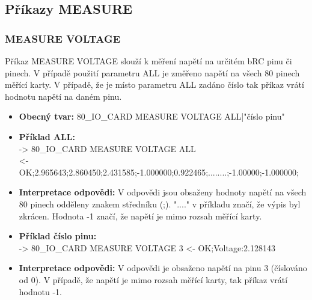 \subsection{Příkazy MEASURE} \label{measure commands}
\subsubsection{MEASURE VOLTAGE}
Příkaz MEASURE VOLTAGE slouží k měření napětí na určitém bRC pinu či pinech.
V případě použití parametru ALL je změřeno napětí na všech 80 pinech měřící karty.
V případě, že je místo parametru ALL zadáno číslo tak příkaz vrátí hodnotu napětí na daném pinu.\\

\begin{itemize}[leftmargin=*]
    \item \textbf{Obecný tvar:} 80\_IO\_CARD MEASURE VOLTAGE ALL|"číslo pinu"
    \item \textbf{Příklad ALL:}\\
    -> 80\_IO\_CARD MEASURE VOLTAGE ALL\\
    <- OK;2.965643;2.860450;2.431585;-1.000000;0.922465;........;-1.00000;-1.000000;
    \item \textbf{Interpretace odpovědi:} V odpovědi jsou obsaženy
    hodnoty napětí na všech 80 pinech odděleny znakem středníku (;). "...." v příkladu značí, že výpis byl zkrácen.
    Hodnota -1 značí, že napětí je mimo rozsah měřící karty.

    \item \textbf{Příklad číslo pinu:}\\
    -> 80\_IO\_CARD MEASURE VOLTAGE 3
    <- OK;Voltage:2.128143\\
    \item \textbf{Interpretace odpovědi:} V odpovědi je obsaženo napětí na pinu 3 (číslováno od 0). V případě, že napětí je mimo rozsah měřící karty, tak příkaz vrátí hodnotu -1.
\end{itemize}

